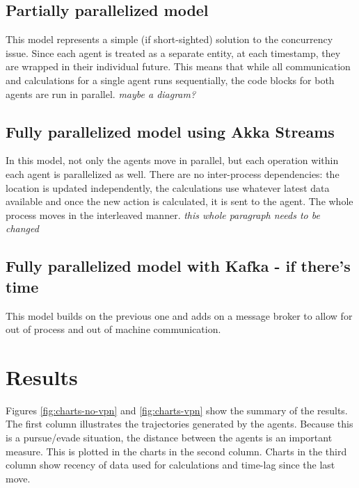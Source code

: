 \documentclass{article}
\begin{document}
\subsection{Partially parallelized model}
This model represents a simple (if short-sighted) solution to the concurrency issue. Since each agent is treated as a separate entity, at each timestamp, they are wrapped in their individual future. This means that while all communication and calculations for a single agent runs sequentially, the code blocks for both agents are run in parallel. \emph{maybe a diagram?}

\subsection{Fully parallelized model using Akka Streams}
In this model, not only the agents move in parallel, but each operation within each agent is parallelized as well. There are no inter-process dependencies: the location is updated independently, the calculations use whatever latest data available and once the new action is calculated, it is sent to the agent. The whole process moves in the interleaved manner. \emph{this whole paragraph needs to be changed}

\subsection{Fully parallelized model with Kafka - if there's time}
This model builds on the previous one and adds on a message broker to allow for out of process and out of machine communication. 

\section{Results}
Figures \ref{fig:charts-no-vpn} and \ref{fig:charts-vpn} show the summary of the results.  The first column illustrates the trajectories generated by the agents. Because this is a pursue/evade situation, the distance between the agents is an important measure. This is plotted in the charts in the second column.
Charts in the third column show recency of data used for calculations and time-lag since the last move.
\end{document}
